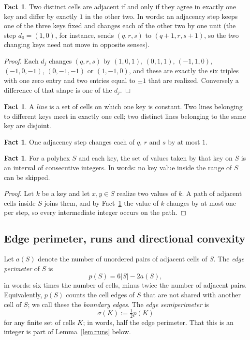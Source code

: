 \documentclass[11pt]{article}
\theoremstyle{plain}
\theoremstyle{definition}
\newtheorem{fact}[theorem]{Fact}
\theoremstyle{remark}
\begin{document}
\begin{fact}\label{f:1}
Two distinct cells are adjacent if and only if they agree in exactly one key and differ
by exactly \(1\) in the other two. In words: an adjacency step keeps one of the three
keys fixed and changes each of the other two by one unit (the step \(d_{0}=(1,0)\), for
instance, sends \((q,r,s)\) to \((q+1,r,s+1)\), so the two changing keys need not move
in opposite senses).
\end{fact}

\begin{proof}
Each \(d_{j}\) changes \((q,r,s)\) by \((1,0,1)\), \((0,1,1)\), \((-1,1,0)\),
\((-1,0,-1)\), \((0,-1,-1)\) or \((1,-1,0)\), and these are exactly the six triples with
one zero entry and two entries equal to \(\pm1\) that are realized. Conversely a
difference of that shape is one of the \(d_{j}\).
\end{proof}

\begin{fact}\label{f:2}
A \emph{line} is a set of cells on which one key is constant. Two lines belonging to
different keys meet in exactly one cell; two distinct lines belonging to the same key are
disjoint.
\end{fact}

\begin{fact}\label{f:3}
One adjacency step changes each of \(q\), \(r\) and \(s\) by at most \(1\).
\end{fact}

\begin{fact}\label{f:4}
For a polyhex \(S\) and each key, the set of values taken by that key on \(S\) is an
interval of consecutive integers. In words: no key value inside the range of \(S\) can be
skipped.
\end{fact}

\begin{proof}
Let \(k\) be a key and let \(x,y\in S\) realize two values of \(k\). A path of adjacent
cells inside \(S\) joins them, and by Fact~\ref{f:3} the value of \(k\) changes by at most
one per step, so every intermediate integer occurs on the path.
\end{proof}

\subsection{Edge perimeter, runs and directional convexity}\label{sec:2.2}

Let \(a(S)\) denote the number of unordered pairs of adjacent cells of \(S\). The
\emph{edge perimeter} of \(S\) is
\begin{equation}\label{eq:p}
   p(S)=6|S|-2a(S),
\end{equation}
in words: six times the number of cells, minus twice the number of adjacent pairs.
Equivalently, \(p(S)\) counts the cell edges of \(S\) that are not shared with another
cell of \(S\); we call these the \emph{boundary edges}. The \emph{edge semiperimeter} is
\[
   \sigma(K):=\tfrac{1}{2}p(K)
\]
for any finite set of cells \(K\); in words, half the edge perimeter. That this is an
integer is part of Lemma~\ref{lem:runs} below.
\end{document}
